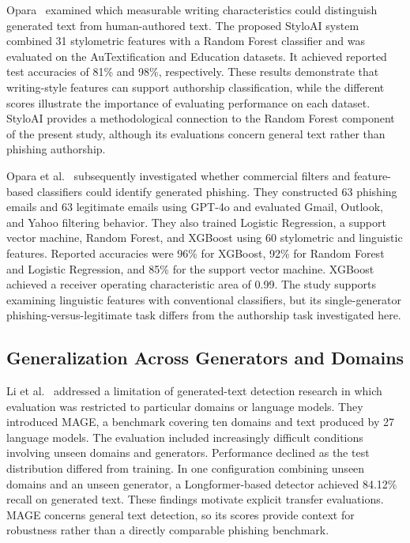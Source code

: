 \documentclass[conference]{IEEEtran}
\begin{document}
Opara~\cite{opara2024styloai} examined which measurable writing
characteristics could distinguish generated text from human-authored
text. The proposed StyloAI system combined 31 stylometric features
with a Random Forest classifier and was evaluated on the
AuTextification and Education datasets. It achieved reported test
accuracies of 81\% and 98\%, respectively. These results demonstrate
that writing-style features can support authorship classification,
while the different scores illustrate the importance of evaluating
performance on each dataset. StyloAI provides a methodological
connection to the Random Forest component of the present study,
although its evaluations concern general text rather than phishing
authorship.

Opara et al.~\cite{opara2025} subsequently investigated whether
commercial filters and feature-based classifiers could identify
generated phishing. They constructed 63 phishing emails and 63
legitimate emails using GPT-4o and evaluated Gmail, Outlook, and
Yahoo filtering behavior. They also trained Logistic Regression,
a support vector machine, Random Forest, and XGBoost using 60
stylometric and linguistic features. Reported accuracies were 96\%
for XGBoost, 92\% for Random Forest and Logistic Regression, and
85\% for the support vector machine. XGBoost achieved a receiver
operating characteristic area of 0.99. The study supports examining
linguistic features with conventional classifiers, but its single-generator
phishing-versus-legitimate task differs from the authorship task
investigated here.

\subsection{Generalization Across Generators and Domains}

Li et al.~\cite{li2024mage} addressed a limitation of generated-text
detection research in which evaluation was restricted to particular
domains or language models. They introduced MAGE, a benchmark
covering ten domains and text produced by 27 language models.
The evaluation included increasingly difficult conditions involving
unseen domains and generators. Performance declined as the test
distribution differed from training. In one configuration combining
unseen domains and an unseen generator, a Longformer-based detector
achieved 84.12\% recall on generated text. These findings motivate
explicit transfer evaluations. MAGE concerns general text detection,
so its scores provide context for robustness rather than a directly
comparable phishing benchmark.
\end{document}

